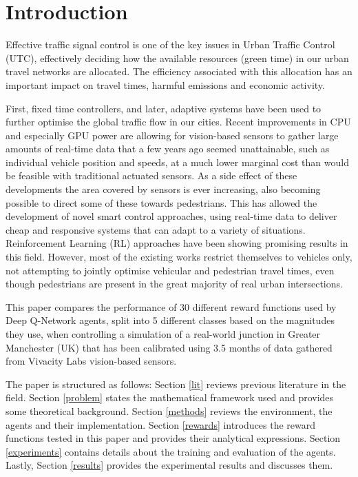 \documentclass[conference]{IEEEtran}
\begin{document}
\IEEEpeerreviewmaketitle

\section{Introduction}
Effective traffic signal control is one of the key issues in Urban Traffic Control (UTC), effectively deciding how the available resources (green time) in our urban travel networks are allocated.
The efficiency associated with this allocation has an important impact on travel times, harmful emissions and economic activity.

First, fixed time controllers, and later, adaptive systems have been used to further optimise the global traffic flow in our cities.
Recent improvements in CPU and especially GPU power are allowing for vision-based sensors to gather large amounts of real-time data that a few years ago seemed unattainable, such as individual vehicle position and speeds, at a much lower marginal cost than would be feasible with traditional actuated sensors.
As a side effect of these developments the area covered by sensors is ever increasing, also becoming possible to direct some of these towards pedestrians.
This has allowed the development of novel smart control approaches, using real-time data to deliver cheap and responsive systems that can adapt to a variety of situations.
Reinforcement Learning (RL) approaches have been showing promising results in this field.
However, most of the existing works restrict themselves to vehicles only, not attempting to jointly optimise vehicular and pedestrian travel times, even though pedestrians are present in the great majority of real urban intersections.

This paper compares the performance of 30 different reward functions used by Deep Q-Network agents, split into 5 different classes based on the magnitudes they use, when controlling a simulation of a real-world junction in Greater Manchester (UK) that has been calibrated using 3.5 months of data gathered from Vivacity Labs vision-based sensors.

The paper is structured as follows:
Section \ref{lit} reviews previous literature in the field.
Section \ref{problem} states the mathematical framework used and provides some theoretical background.  
Section \ref{methods} reviews the environment, the agents and their implementation.
Section \ref{rewards} introduces the reward functions tested in this paper and provides their analytical expressions.
Section \ref{experiments} contains details about the training and evaluation of the agents.
Lastly, Section \ref{results} provides the experimental results and discusses them.
\end{document}
